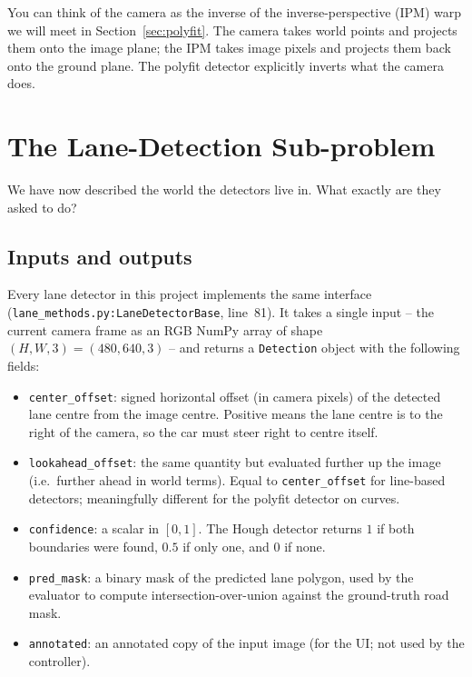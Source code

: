 \begin{intuition}
You can think of the camera as the inverse of the inverse-perspective
(IPM) warp we will meet in Section~\ref{sec:polyfit}. The camera takes
world points and projects them onto the image plane; the IPM takes
image pixels and projects them back onto the ground plane. The polyfit
detector explicitly inverts what the camera does.
\end{intuition}

\section{The Lane-Detection Sub-problem}
\label{sec:sub}

We have now described the world the detectors live in. What exactly
are they asked to do?

\subsection{Inputs and outputs}

Every lane detector in this project implements the same interface
(\texttt{lane\_methods.py:LaneDetectorBase}, line~81). It takes a
single input -- the current camera frame as an RGB NumPy array of
shape $(H,W,3)=(480,640,3)$ -- and returns a \texttt{Detection} object
with the following fields:
\begin{itemize}[leftmargin=1.4em,itemsep=2pt]
  \item \texttt{center\_offset}: signed horizontal offset (in camera
        pixels) of the detected lane centre from the image centre.
        Positive means the lane centre is to the right of the camera,
        so the car must steer right to centre itself.
  \item \texttt{lookahead\_offset}: the same quantity but evaluated
        further up the image (i.e.\ further ahead in world terms).
        Equal to \texttt{center\_offset} for line-based detectors;
        meaningfully different for the polyfit detector on curves.
  \item \texttt{confidence}: a scalar in $[0,1]$. The Hough detector
        returns $1$ if both boundaries were found, $0.5$ if only one,
        and $0$ if none.
  \item \texttt{pred\_mask}: a binary mask of the predicted lane
        polygon, used by the evaluator to compute
        intersection-over-union against the ground-truth road mask.
  \item \texttt{annotated}: an annotated copy of the input image (for
        the UI; not used by the controller).
\end{itemize}

